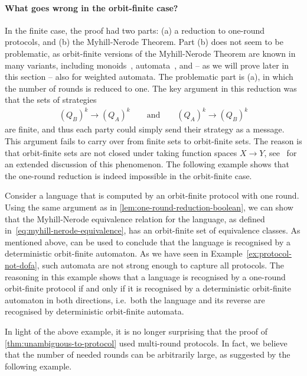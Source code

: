 \paragraph*{What goes wrong in the orbit-finite case?}
In the finite case, the proof had two parts: (a) a reduction to one-round protocols, and (b) the Myhill-Nerode Theorem. Part (b) does not seem to be problematic, as orbit-finite versions of the Myhill-Nerode Theorem are known in many variants, including monoids~\cite[Lemma 3.3]{bojanczykNominalMonoids2013}, automata~\cite[Section 3.2]{bojanczykAutomataTheoryNominal2014}, and -- as we will prove later in this section -- also for weighted automata. The problematic part is (a), in which the number of rounds is reduced to one. The key argument in this reduction  was that the sets of strategies 
  \begin{align*}
    (Q_B)^k \to (Q_A)^k \qquad \text{and} \qquad (Q_A)^k \to (Q_B)^k
    \end{align*}
are finite, and thus each party could simply send their strategy as a message.  This argument fails to carry over from finite sets to orbit-finite sets. The reason is  that orbit-finite sets are not closed under taking function spaces $X \to Y$, see~\cite{functionSpaces2024} for an extended discussion of this phenomenon.  The following example shows that the one-round reduction is indeed impossible in the orbit-finite case.

\begin{myexample}
    \label{ex:no-one-round-reduction} Consider a language that is computed by an orbit-finite protocol with one round. Using the same argument as in \cref{lem:one-round-reduction-boolean}, we can show that the Myhill-Nerode equivalence relation for the language, as defined in~\eqref{eq:myhill-nerode-equivalence}, has an orbit-finite set of equivalence classes. As mentioned above, \cite[Section 3.2]{bojanczykAutomataTheoryNominal2014} can be used to conclude that the language is recognised by a deterministic orbit-finite automaton. As we have seen in Example~\ref{ex:protocol-not-dofa}, such automata are not strong enough to capture all protocols. The reasoning in this example shows that a language is recognised by a one-round orbit-finite protocol if and only if it is recognised by a deterministic orbit-finite automaton in both directions, i.e.~both the language and its reverse are recognised by deterministic orbit-finite automata. 
\end{myexample}

In light of the above example, it is no longer surprising that the proof of \cref{thm:unambiguous-to-protocol} used multi-round protocols. In fact, we believe that the number of needed rounds can be arbitrarily large, as suggested by the following example. 

